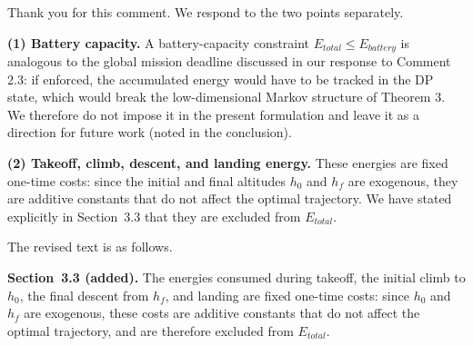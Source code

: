 \begin{revresponse}[]
	Thank you for this comment. We respond to the two points separately.

	\textbf{(1) Battery capacity.} A battery-capacity constraint $E_{total}\le E_{battery}$ is analogous to the global mission deadline discussed in our response to Comment 2.3: if enforced, the accumulated energy would have to be tracked in the DP state, which would break the low-dimensional Markov structure of Theorem 3. We therefore do not impose it in the present formulation and leave it as a direction for future work (noted in the conclusion).

	\textbf{(2) Takeoff, climb, descent, and landing energy.} These energies are fixed one-time costs: since the initial and final altitudes $h_0$ and $h_f$ are exogenous, they are additive constants that do not affect the optimal trajectory. We have stated explicitly in Section~3.3 that they are excluded from $E_{total}$.

	The revised text is as follows.
	\begin{changes}
		\textbf{Section~3.3 (added).} The energies consumed during takeoff, the initial climb to $h_0$, the final descent from $h_f$, and landing are fixed one-time costs: since $h_0$ and $h_f$ are exogenous, these costs are additive constants that do not affect the optimal trajectory, and are therefore excluded from $E_{total}$.
	\end{changes}
\end{revresponse}


